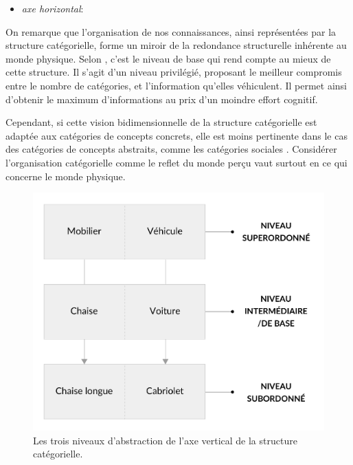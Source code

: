 \begin{itemize}
\item \textit{axe horizontal}: 
\end{itemize}

On remarque que l'organisation de nos connaissances, ainsi représentées par la structure catégorielle, forme un miroir de la redondance structurelle inhérente au monde physique. Selon \citep[p. 28]{rosch1978cognition}, c'est le niveau de base qui rend compte au mieux de cette structure. Il s'agit d'un niveau privilégié, proposant le meilleur compromis entre le nombre de catégories, et l'information qu'elles véhiculent. Il permet ainsi d'obtenir le maximum d'informations au prix d'un moindre effort cognitif.

Cependant, si cette vision bidimensionnelle de la structure catégorielle est adaptée aux catégories de concepts concrets, elle est moins pertinente dans le cas des catégories de concepts abstraits, comme les catégories sociales \citep[p. 72-88]{dubois1991semantique}. Considérer l'organisation catégorielle comme le reflet du monde perçu vaut surtout en ce qui concerne le monde physique.

\begin{figure}[t]
        \myfloatalign
        \includegraphics[width=.6\linewidth]{gfx/ch_3/categorieLVL}
        \caption{Les trois niveaux d'abstraction de l'axe vertical de la structure catégorielle.}\label{fig:categorieLVL}
\end{figure}

